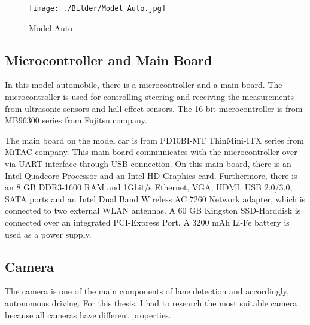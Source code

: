 \begin{figure}[H]
	\centering
	\hspace*{0cm}   
	\texttt{[image: ./Bilder/Model Auto.jpg]}
	\caption{Model Auto}
\end{figure}

%
\subsection{Microcontroller and Main Board}\label{sec:Microcontroller and Main Board}


In this model automobile, there is a microcontroller and a main board. The microcontroller is used for controlling steering 
and receiving the measurements from ultrasonic sensors and hall effect sensors. The 16-bit microcontroller is from 
MB96300 series from Fujitsu company.

The main board on the model car is from PD10BI-MT ThinMini-ITX series from MiTAC company. This main board communicates 
with the microcontroller over via UART interface through USB connection. On this main board, there is an Intel 
Quadcore-Processor and an Intel HD Graphics card. Furthermore, there is an 8 GB DDR3-1600 RAM and 1Gbit/s Ethernet, VGA, HDMI, USB 2.0/3.0, SATA ports and an Intel Dual Band Wireless AC 7260 Network adapter, which is connected to two external WLAN antennas. A 60 GB Kingston SSD-Harddisk is connected over an integrated PCI-Express Port. A 3200 mAh Li-Fe battery is used as a power supply.
%

\subsection{Camera}\label{sec:Camera}


The camera is one of the main components of lane detection and accordingly, autonomous driving. For this thesis, I had 
to research the most suitable camera because all cameras have different properties.

